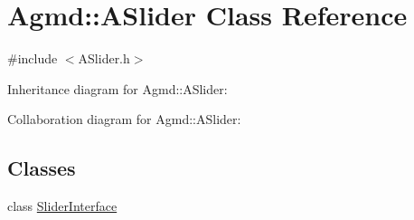 \hypertarget{class_agmd_1_1_a_slider}{\section{Agmd\+:\+:A\+Slider Class Reference}
\label{class_agmd_1_1_a_slider}
}


{\ttfamily \#include $<$A\+Slider.\+h$>$}



Inheritance diagram for Agmd\+:\+:A\+Slider\+:


Collaboration diagram for Agmd\+:\+:A\+Slider\+:
\subsection*{Classes}
\begin{DoxyCompactItemize}
\item 
class \hyperlink{class_agmd_1_1_a_slider_1_1_slider_interface}{Slider\+Interface}
\end{DoxyCompactItemize}
